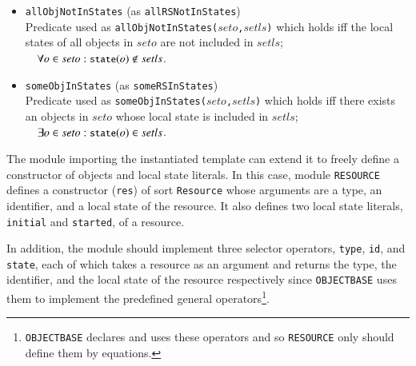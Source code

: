\documentclass[12pt]{report}
\newcommand{\mbstt}[1]{\mbox{\small{\tt {#1}}}}
\newcommand{\stt}[1]{{\small{\tt {#1}}}}
\begin{document}
\begin{itemize}
\item \stt{allObjNotInStates} (as \stt{allRSNotInStates})\\
  Predicate used as \stt{allObjNotInStates($seto$,$setls$)} which holds iff
  the local states of all objects in $seto$ are not included
  in $setls$;\\$~~~~\forall o\in seto:\mbstt{state}(o)\not\in setls$.
\item \stt{someObjInStates} (as \stt{someRSInStates})\\ 
  Predicate used as \stt{someObjInStates($seto$,$setls$)} which holds
  iff there exists an objects in $seto$ whose local state is included
  in $setls$;\\$~~~~\exists o\in seto:\mbstt{state}(o)\in setls$.
\end{itemize}

The module importing the instantiated template can extend it to
freely define a constructor of objects and local state literals.  In
this case, module {\tt RESOURCE} defines a constructor ({\tt res}) of
sort {\tt Resource} whose arguments are a type, an identifier, and a
local state of the resource. It also defines two local state literals,
{\tt initial} and {\tt started}, of a resource.

In addition, the module should implement three selector operators,
{\tt type}, {\tt id}, and {\tt state}, each of which takes a resource
as an argument and returns the type, the identifier, and the local
state of the resource respectively since {\tt OBJECTBASE} uses them to
implement the predefined general operators\footnote{{\tt OBJECTBASE}
  declares and uses these operators and so {\tt RESOURCE} only should
  define them by equations.}.
\end{document}
